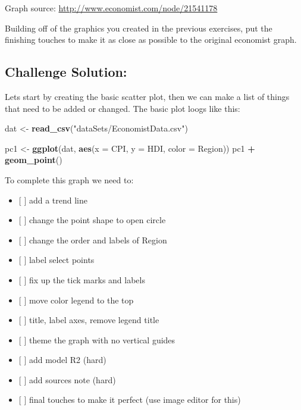\documentclass[]{book}
\newenvironment{Shaded}{\begin{snugshade}}{\end{snugshade}}
\newcommand{\KeywordTok}[1]{\textcolor[rgb]{0.13,0.29,0.53}{\textbf{#1}}}
\newcommand{\DataTypeTok}[1]{\textcolor[rgb]{0.13,0.29,0.53}{#1}}
\newcommand{\StringTok}[1]{\textcolor[rgb]{0.31,0.60,0.02}{#1}}
\newcommand{\OperatorTok}[1]{\textcolor[rgb]{0.81,0.36,0.00}{\textbf{#1}}}
\newcommand{\NormalTok}[1]{#1}
\providecommand{\tightlist}{%
  \setlength{\itemsep}{0pt}\setlength{\parskip}{0pt}}
\begin{document}
Graph source: \url{http://www.economist.com/node/21541178}

Building off of the graphics you created in the previous exercises, put
the finishing touches to make it as close as possible to the original
economist graph.

\subsection{Challenge Solution:}\label{challenge-solution}

Lets start by creating the basic scatter plot, then we can make a list
of things that need to be added or changed. The basic plot loogs like
this:

\begin{Shaded}
\begin{Highlighting}[]
\NormalTok{dat <-}\StringTok{ }\KeywordTok{read_csv}\NormalTok{(}\StringTok{"dataSets/EconomistData.csv"}\NormalTok{)}

\NormalTok{pc1 <-}\StringTok{ }\KeywordTok{ggplot}\NormalTok{(dat, }\KeywordTok{aes}\NormalTok{(}\DataTypeTok{x =}\NormalTok{ CPI, }\DataTypeTok{y =}\NormalTok{ HDI, }\DataTypeTok{color =}\NormalTok{ Region))}
\NormalTok{pc1 }\OperatorTok{+}\StringTok{ }\KeywordTok{geom_point}\NormalTok{()}
\end{Highlighting}
\end{Shaded}

To complete this graph we need to:

\begin{itemize}
\tightlist
\item
  {[} {]} add a trend line
\item
  {[} {]} change the point shape to open circle
\item
  {[} {]} change the order and labels of Region
\item
  {[} {]} label select points
\item
  {[} {]} fix up the tick marks and labels
\item
  {[} {]} move color legend to the top
\item
  {[} {]} title, label axes, remove legend title
\item
  {[} {]} theme the graph with no vertical guides
\item
  {[} {]} add model R2 (hard)
\item
  {[} {]} add sources note (hard)
\item
  {[} {]} final touches to make it perfect (use image editor for this)
\end{itemize}
\end{document}
